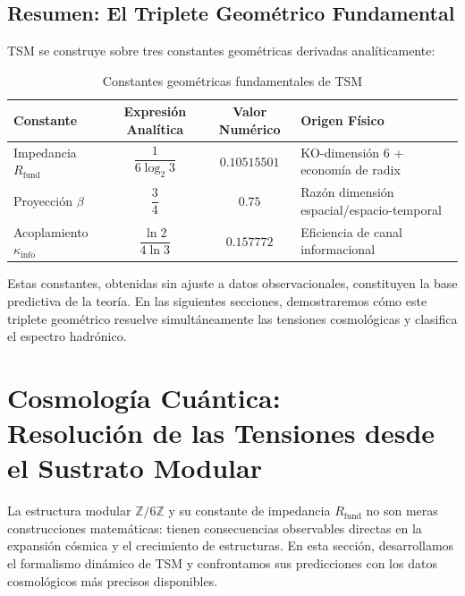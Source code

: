 \documentclass[11pt, a4paper]{article}
\theoremstyle{plain}
\theoremstyle{definition}
\newcommand{\Zmod}{\mathbb{Z}/6\mathbb{Z}}
\newcommand{\Rfactor}{R_{\text{fund}}}
\newcommand{\Kinfo}{\kappa_{\text{info}}}
\begin{document}
\subsection{Resumen: El Triplete Geométrico Fundamental}

TSM se construye sobre tres constantes geométricas derivadas analíticamente:

\begin{table}[H]
\centering
\small %
\caption{Constantes geométricas fundamentales de TSM}
\label{tab:constantes_fundamentales}
\begin{tabular}{l c c p{4.5cm}} %
\toprule
\textbf{Constante} & \textbf{Expresión Analítica} & \textbf{Valor Numérico} & \textbf{Origen Físico} \\
\midrule
Impedancia $\Rfactor$ & $\dfrac{1}{6\log_2 3}$ & $0.10515501$ & KO-dimensión 6 + economía de radix \\
\addlinespace %
Proyección $\beta$ & $\dfrac{3}{4}$ & $0.75$ & Razón dimensión espacial/espacio-temporal \\
\addlinespace
Acoplamiento $\Kinfo$ & $\dfrac{\ln 2}{4\ln 3}$ & $0.157772$ & Eficiencia de canal informacional \\
\bottomrule
\end{tabular}
\end{table}

Estas constantes, obtenidas sin ajuste a datos observacionales, constituyen la base predictiva de la teoría. En las siguientes secciones, demostraremos cómo este triplete geométrico resuelve simultáneamente las tensiones cosmológicas y clasifica el espectro hadrónico.


\section[Cosmología Cuántica: Resolución de las Tensiones desde el Sustrato Modular]{Cosmología Cuántica: \\ Resolución de las Tensiones desde el Sustrato Modular}
\label{sec:cosmologia}

La estructura modular $\Zmod$ y su constante de impedancia $\Rfactor$ no son meras construcciones matemáticas: tienen consecuencias observables directas en la expansión cósmica y el crecimiento de estructuras. En esta sección, desarrollamos el formalismo dinámico de TSM y confrontamos sus predicciones con los datos cosmológicos más precisos disponibles.
\end{document}
